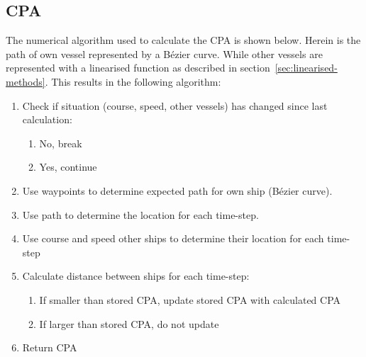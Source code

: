 \subsection{\acf{CPA}}
\label{ssec:CPA-calculation}
The numerical algorithm used to calculate the CPA is shown below. Herein is the path of own vessel represented by a Bézier curve. While other vessels are represented with a linearised function as described in section~\ref{sec:linearised-methods}. This results in the following algorithm:
\begin{enumerate}
	\item Check if situation (course, speed, other vessels) has changed since last calculation:
	\begin{enumerate}
		\item No, break
		\item Yes, continue
	\end{enumerate}
	\item Use waypoints to determine expected path for own ship (Bézier curve).
	\item Use path to determine the location for each time-step.
	\item Use course and speed other ships to determine their location for each time-step
	\item Calculate distance between ships for each time-step:
	\begin{enumerate}
		\item If smaller than stored CPA, update stored CPA with calculated CPA
		\item If larger than stored CPA, do not update
	\end{enumerate}
	\item Return CPA
\end{enumerate}

